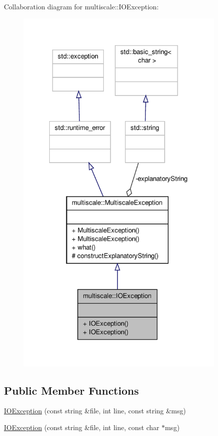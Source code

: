 Collaboration diagram for multiscale\-:\-:I\-O\-Exception\-:\nopagebreak
\begin{figure}[H]
\begin{center}
\leavevmode
\includegraphics[width=290pt]{classmultiscale_1_1IOException__coll__graph}
\end{center}
\end{figure}
\subsection*{Public Member Functions}
\begin{DoxyCompactItemize}
\item 
\hyperlink{classmultiscale_1_1IOException_a081bb2e4c214a18cbace0d93e1b60488}{I\-O\-Exception} (const string \&file, int line, const string \&msg)
\item 
\hyperlink{classmultiscale_1_1IOException_a2ccacf8690ac56b07af15da7fa7bb93a}{I\-O\-Exception} (const string \&file, int line, const char $\ast$msg)
\end{DoxyCompactItemize}
